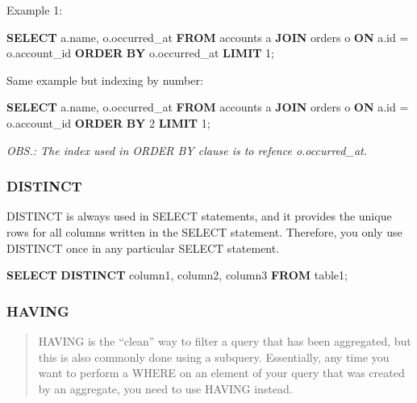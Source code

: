 \documentclass[]{book}
\newenvironment{Shaded}{\begin{snugshade}}{\end{snugshade}}
\newcommand{\KeywordTok}[1]{\textcolor[rgb]{0.13,0.29,0.53}{\textbf{#1}}}
\newcommand{\DecValTok}[1]{\textcolor[rgb]{0.00,0.00,0.81}{#1}}
\newcommand{\NormalTok}[1]{#1}
\begin{document}
Example 1:

\begin{Shaded}
\begin{Highlighting}[]
\KeywordTok{SELECT}\NormalTok{ a.name, o.occurred_at}
\KeywordTok{FROM}\NormalTok{ accounts a}
\KeywordTok{JOIN}\NormalTok{ orders o}
\KeywordTok{ON}\NormalTok{ a.id = o.account_id}
\KeywordTok{ORDER} \KeywordTok{BY}\NormalTok{ o.occurred_at}
\KeywordTok{LIMIT} \DecValTok{1}\NormalTok{;}
\end{Highlighting}
\end{Shaded}

Same example but indexing by number:

\begin{Shaded}
\begin{Highlighting}[]
\KeywordTok{SELECT}\NormalTok{ a.name, o.occurred_at}
\KeywordTok{FROM}\NormalTok{ accounts a}
\KeywordTok{JOIN}\NormalTok{ orders o}
\KeywordTok{ON}\NormalTok{ a.id = o.account_id}
\KeywordTok{ORDER} \KeywordTok{BY} \DecValTok{2}
\KeywordTok{LIMIT} \DecValTok{1}\NormalTok{;}
\end{Highlighting}
\end{Shaded}

\emph{OBS.: The index used in ORDER BY clause is to refence
o.occurred\_at.}

\subsubsection{DISTINCT}\label{distinct}

DISTINCT is always used in SELECT statements, and it provides the unique
rows for all columns written in the SELECT statement. Therefore, you
only use DISTINCT once in any particular SELECT statement.

\begin{Shaded}
\begin{Highlighting}[]
\KeywordTok{SELECT} \KeywordTok{DISTINCT}\NormalTok{ column1, column2, column3}
\KeywordTok{FROM}\NormalTok{ table1;}
\end{Highlighting}
\end{Shaded}

\subsubsection{HAVING}\label{having}

\begin{quote}
HAVING is the ``clean'' way to filter a query that has been aggregated,
but this is also commonly done using a subquery. Essentially, any time
you want to perform a WHERE on an element of your query that was created
by an aggregate, you need to use HAVING instead.
\end{quote}
\end{document}
